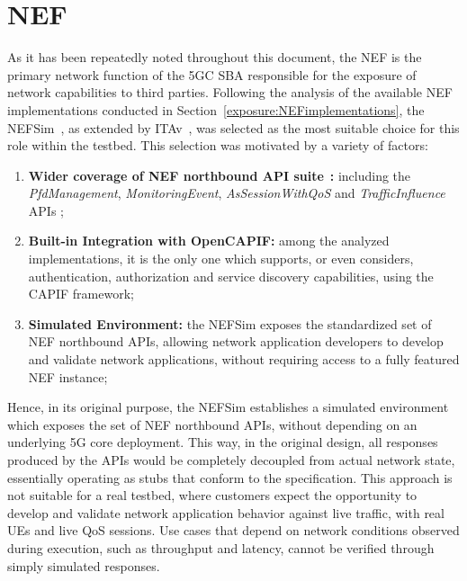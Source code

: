 \section{\acs{NEF}}
\label{chap:impl:nef}

As it has been repeatedly noted throughout this document, the \acs{NEF} is the primary network function of the \acs{5GC} \acs{SBA} responsible for the exposure of network capabilities to third parties. Following the analysis of the available \acs{NEF} implementations conducted in Section~\ref{exposure:NEFimplementations}, the NEFSim~\cite{NEFsim}, as extended by \acs{ITAv}~\cite{NEFemulatorAtnog}, was selected as the most suitable choice for this role within the testbed. This selection was motivated by a variety of factors:

\begin{enumerate}
    \item \textbf{Wider coverage of \acs{NEF} northbound \acs{API} suite}~\cite{ETSI_TS_129_522_V18_11_0}\textbf{:} including the \textit{PfdManagement}, \textit{MonitoringEvent}, \textit{AsSessionWithQoS} and \textit{TrafficInfluence} \acsp{API} ;
    \item \textbf{Built-in Integration with OpenCAPIF:} among the analyzed implementations, it is the only one which supports, or even considers, authentication, authorization and service discovery capabilities, using the \acs{CAPIF} framework;
    \item \textbf{Simulated Environment:} the NEFSim exposes the standardized set of \acs{NEF} northbound \acsp{API}, allowing network application developers to develop and validate network applications, without requiring access to a fully featured \acs{NEF} instance;
\end{enumerate}

Hence, in its original purpose, the NEFSim establishes a simulated environment which exposes the set of \acs{NEF} northbound \acsp{API}, without depending on an underlying \acs{5G} core deployment. This way, in the original design, all responses produced by the \acsp{API} would be completely decoupled from actual network state, essentially operating as stubs that conform to the specification. This approach is not suitable for a real testbed, where customers expect the opportunity to develop and validate network application behavior against live traffic, with real \acsp{UE} and live \acs{QoS} sessions. Use cases that depend on network conditions observed during execution, such as throughput and latency, cannot be verified through simply simulated responses.

